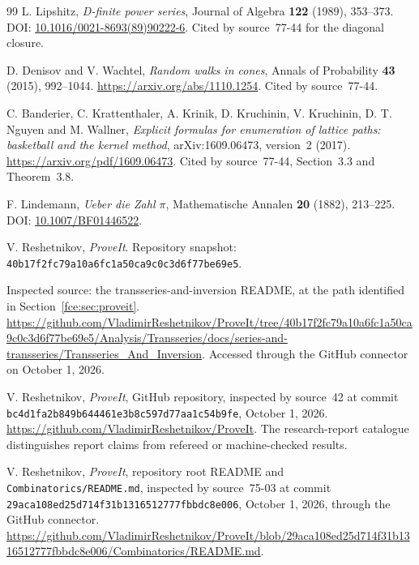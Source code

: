 \documentclass[11pt,a4paper]{article}
\numberwithin{equation}{section}
\theoremstyle{definition}\newtheorem{definition}[theorem]{Definition}
\theoremstyle{remark}\newtheorem{remark}[theorem]{Remark}
\begin{document}
\begin{thebibliography}{99}
L. Lipshitz, \emph{D-finite power series}, Journal of Algebra \textbf{122}
(1989), 353--373.
DOI: \href{https://doi.org/10.1016/0021-8693(89)90222-6}{10.1016/0021-8693(89)90222-6}.
Cited by source~77-44 for the diagonal closure.

D. Denisov and V. Wachtel, \emph{Random walks in cones}, Annals of
Probability \textbf{43} (2015), 992--1044.
\url{https://arxiv.org/abs/1110.1254}. Cited by source~77-44.

C. Banderier, C. Krattenthaler, A. Krinik, D. Kruchinin, V. Kruchinin,
D. T. Nguyen and M. Wallner, \emph{Explicit formulas for enumeration of
lattice paths: basketball and the kernel method}, arXiv:1609.06473,
version~2 (2017). \url{https://arxiv.org/pdf/1609.06473}. Cited by
source~77-44, Section~3.3 and Theorem~3.8.

F. Lindemann, \emph{Ueber die Zahl $\pi$},
Mathematische Annalen \textbf{20} (1882), 213--225.
DOI: \href{https://doi.org/10.1007/BF01446522}{10.1007/BF01446522}.

V. Reshetnikov, \emph{ProveIt}. Repository snapshot:\\
{\small\texttt{40b17f2fc79a10a6fc1a50ca9c0c3d6f77be69e5}}.\par
Inspected source: the transseries-and-inversion README, at the path
identified in Section~\ref{fce:sec:proveit}.
\url{https://github.com/VladimirReshetnikov/ProveIt/tree/40b17f2fc79a10a6fc1a50ca9c0c3d6f77be69e5/Analysis/Transseries/docs/series-and-transseries/Transseries_And_Inversion}.
Accessed through the GitHub connector on October 1, 2026.

V. Reshetnikov, \emph{ProveIt}, GitHub repository, inspected by source~42 at
commit \texttt{bc4d1fa2b849b644461e3b8c597d77aa1c54b9fe}, October 1, 2026.
\url{https://github.com/VladimirReshetnikov/ProveIt}. The research-report
catalogue distinguishes report claims from refereed or machine-checked
results.

V. Reshetnikov, \emph{ProveIt}, repository root README and
\texttt{Combinatorics/README.md}, inspected by source~75-03 at commit
\texttt{29aca108ed25d714f31b1316512777fbbdc8e006}, October 1, 2026, through
the GitHub connector.
\url{https://github.com/VladimirReshetnikov/ProveIt/blob/29aca108ed25d714f31b1316512777fbbdc8e006/Combinatorics/README.md}.
\end{thebibliography}
\end{document}
